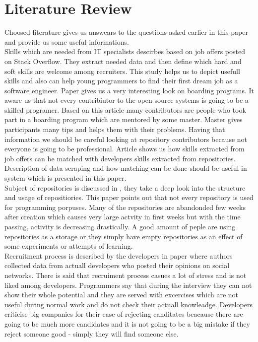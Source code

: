 \section{Literature Review}
Choosed literature gives us answears to the questions asked earlier in this paper and provide us some useful informations. \\Skills which are needed from IT specialists descirbes \cite{StackOverflowStudies} based on job offers posted on Stack Overflow. They extract needed data and then define which hard and soft skills are welcome among recruiters. This study helps us to depict usefull skills and also can help young programmers to find their first dream job as a software engineer. Paper \cite{DoOnBoardingProgramsWork} gives us a very interesting look on boarding programs. It aware us that not every contribiutor to the open source systems is going to be a skilled programer. Based on this article many contributors are people who took part in a boarding program which are mentored by some master. Master gives participants many tips and helps them with their problems. Having that information we should be careful looking at repository contributors because not everyone is going to be professional. Article \cite{GitHubProfilesToJobAdv} shows us how skills extracted from job offers can be matched with developers skills extracted from repositories. Description of data scraping and how matching can be done should be useful in system which is presented in this paper.
\\Subject of repositories is discussed in \cite{MiningGitHub}, they take a deep look into the structure and usage of repositiories. This paper points out that not every repository is used for programming porpuses. Many of the repositories are abandonded few weeks after creation which causes very large actvity in first weeks but with the time passing, activity is decreasing drastically. A good amount of peple are using repositories as a storage or they simply have empty repositories as an effect of some experiments or attempts of learning. 
\\Recruitment process is described by the developers in paper \cite{HiringIsBroken} where authors collected data from actuall developers who posted their opinions on social networks. There is said that recruiment process casues a lot of stress and is not liked among developers. Programmers say that during the interview they can not show their whole potential and they are served with excercises which are not useful during normal work and do not check their actuall knowleadge. Developers criticise big companies for their ease of rejecting canditates beacause there are going to be much more candidates and it is not going to be a big mistake if they reject someone good - simply they will find someone else.
